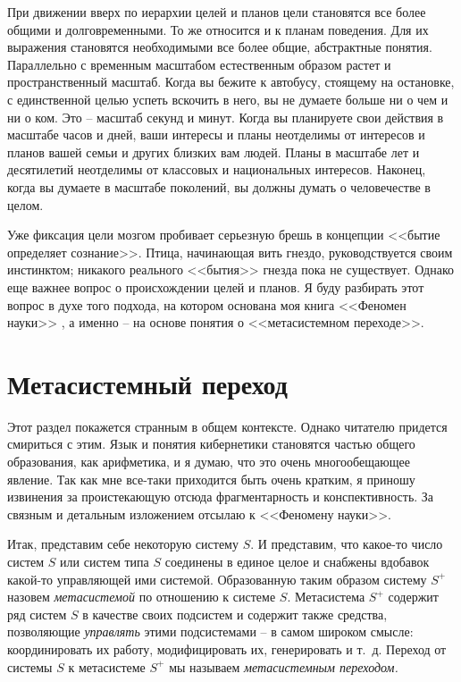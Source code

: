 \documentclass{book}
\begin{document}
При движении вверх по иерархии целей и планов цели становятся все более общими и долговременными. То же относится и к планам 
поведения. Для их выражения становятся необходимыми все более общие, абстрактные понятия. Параллельно с временным масштабом 
естественным образом растет и пространственный масштаб. Когда вы бежите к автобусу, стоящему на остановке, с единственной целью 
успеть вскочить в него, вы не думаете больше ни о чем и ни о ком. Это -- масштаб секунд и минут. Когда вы планируете свои 
действия в масштабе часов и дней, ваши интересы и планы неотделимы от инте­ресов и планов вашей семьи и других близких вам людей. 
Пла­ны в масштабе лет и десятилетий неотделимы от классовых и национальных интересов. Наконец, когда вы думаете в масш­табе 
поколений, вы должны думать о человечестве в целом.

Уже фиксация цели мозгом пробивает серьезную брешь в концепции <<бытие определяет сознание>>. Птица, начинающая вить гнездо, 
руководствуется своим инстинктом; никакого реального <<бытия>> гнезда пока не существует. Однако еще важнее вопрос о происхождении целей и планов. Я буду раз­бирать этот вопрос в духе того подхода, на котором основана моя книга <<Феномен науки>>%
,
а именно -- на основе понятия о <<метасистемном переходе>>.


\section{Метасистемный переход}

Этот раздел покажется странным в общем контексте. Однако читателю придется смириться с этим. Язык и понятия кибернетики 
становятся частью общего образования, как арифметика, и я думаю, что это очень многообещающее явление. Так как мне все-таки 
приходится быть очень кратким, я приношу извинения за проистекающую отсюда фрагментарность и кон­спективность. За связным и 
детальным изложением отсылаю к <<Феномену науки>>.

Итак, представим себе некоторую систему $S$. И представим, что какое-то число систем $S$ или систем типа $S$ соединены в еди­ное 
целое и снабжены вдобавок какой-то управляющей ими системой. Образованную таким образом систему $S^{+}$ назовем 
\textit{метасистемой} по отношению к системе $S$. Метасистема $S^{+}$ содержит ряд систем $S$ в качестве своих подсистем и содержит также средства, позволяющие \textit{управлять}  этими подсистемами -- в самом широком смысле: координировать их работу,
модифицировать их, генерировать и т.~д. Переход от системы $S$ к метасистеме $S^{+}$ мы называем \textit{метасистемным переходом.} 
\end{document}
